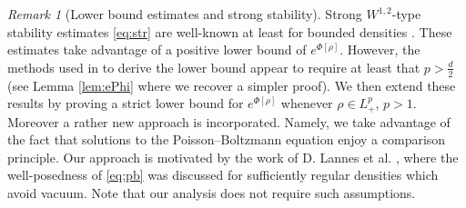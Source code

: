 \documentclass[11pt,reqno,a4paper]{amsart}
\newcommand{\R}{\mathbb{R}}
\theoremstyle{definition}
\theoremstyle{remark}
\newtheorem{remark}[lemma]{Remark}
\numberwithin{equation}{section}
\newcommand{\calP}{\mathcal P}
\newcommand{\calS}{\mathcal S}
\begin{document}
\begin{remark}[Lower bound estimates and strong stability]
Strong $W^{1,2}$-type stability estimates \eqref{eq:str} are well-known at least for bounded densities \cite{griffinpickering2024,griffinpickeringiacobelli2021Torus}. These estimates take advantage of a positive lower bound of $e^{\Phi[\rho]}$. However, the methods used in \cite{griffinpickering2024} to derive the lower bound appear to require at least that $p>\frac{d}{2}$ (see Lemma \ref{lem:ePhi} where we recover a simpler proof). We then extend these results by proving a strict lower bound for $e^{\Phi[\rho]}$ whenever $\rho\in L^p_+$, $p>1$. Moreover a rather new approach is incorporated. Namely, we take advantage of the fact that solutions to the Poisson--Boltzmann equation enjoy a comparison principle. Our approach is motivated by the work of D. Lannes et al. \cite{lanneslinaressaut2013}, where the well-posedness of \eqref{eq:pb} was discussed for sufficiently regular densities which avoid vacuum. Note that our analysis does not require such assumptions.






 



 
 
 

\end{remark}
\end{document}
